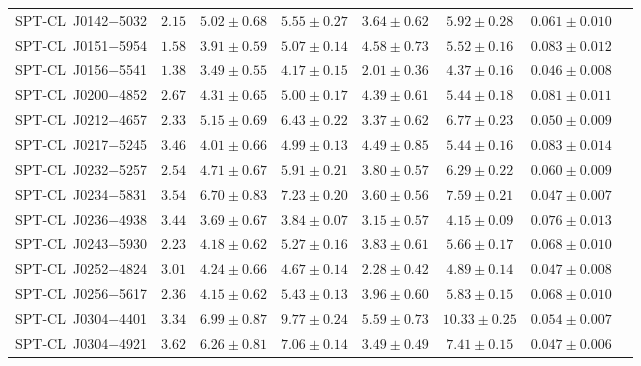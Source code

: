 \begin{table}
{\begin{tabular}{lccccccc}
    SPT-CL~J0142$-$5032    &$ 2.15 $    &$ 5.02 \pm 0.68 $    &$ 5.55 \pm 0.27 $    &$ 3.64 \pm 0.62 $     &$ 5.92 \pm 0.28 $    &$ 0.061 \pm 0.010 $    \\ 
    SPT-CL~J0151$-$5954    &$ 1.58 $    &$ 3.91 \pm 0.59 $    &$ 5.07 \pm 0.14 $    &$ 4.58 \pm 0.73 $     &$ 5.52 \pm 0.16 $    &$ 0.083 \pm 0.012 $    \\ 
    SPT-CL~J0156$-$5541    &$ 1.38 $    &$ 3.49 \pm 0.55 $    &$ 4.17 \pm 0.15 $    &$ 2.01 \pm 0.36 $     &$ 4.37 \pm 0.16 $    &$ 0.046 \pm 0.008 $    \\ 
    SPT-CL~J0200$-$4852    &$ 2.67 $    &$ 4.31 \pm 0.65 $    &$ 5.00 \pm 0.17 $    &$ 4.39 \pm 0.61 $     &$ 5.44 \pm 0.18 $    &$ 0.081 \pm 0.011 $    \\ 
    SPT-CL~J0212$-$4657    &$ 2.33 $    &$ 5.15 \pm 0.69 $    &$ 6.43 \pm 0.22 $    &$ 3.37 \pm 0.62 $     &$ 6.77 \pm 0.23 $    &$ 0.050 \pm 0.009 $    \\ 
    SPT-CL~J0217$-$5245    &$ 3.46 $    &$ 4.01 \pm 0.66 $    &$ 4.99 \pm 0.13 $    &$ 4.49 \pm 0.85 $     &$ 5.44 \pm 0.16 $    &$ 0.083 \pm 0.014 $    \\ 
    SPT-CL~J0232$-$5257    &$ 2.54 $    &$ 4.71 \pm 0.67 $    &$ 5.91 \pm 0.21 $    &$ 3.80 \pm 0.57 $     &$ 6.29 \pm 0.22 $    &$ 0.060 \pm 0.009 $    \\ 
    SPT-CL~J0234$-$5831    &$ 3.54 $    &$ 6.70 \pm 0.83 $    &$ 7.23 \pm 0.20 $    &$ 3.60 \pm 0.56 $     &$ 7.59 \pm 0.21 $    &$ 0.047 \pm 0.007 $    \\ 
    SPT-CL~J0236$-$4938    &$ 3.44 $    &$ 3.69 \pm 0.67 $    &$ 3.84 \pm 0.07 $    &$ 3.15 \pm 0.57 $     &$ 4.15 \pm 0.09 $    &$ 0.076 \pm 0.013 $    \\ 
    SPT-CL~J0243$-$5930    &$ 2.23 $    &$ 4.18 \pm 0.62 $    &$ 5.27 \pm 0.16 $    &$ 3.83 \pm 0.61 $     &$ 5.66 \pm 0.17 $    &$ 0.068 \pm 0.010 $    \\ 
    SPT-CL~J0252$-$4824    &$ 3.01 $    &$ 4.24 \pm 0.66 $    &$ 4.67 \pm 0.14 $    &$ 2.28 \pm 0.42 $     &$ 4.89 \pm 0.14 $    &$ 0.047 \pm 0.008 $    \\ 
    SPT-CL~J0256$-$5617    &$ 2.36 $    &$ 4.15 \pm 0.62 $    &$ 5.43 \pm 0.13 $    &$ 3.96 \pm 0.60 $     &$ 5.83 \pm 0.15 $    &$ 0.068 \pm 0.010 $    \\ 
    SPT-CL~J0304$-$4401    &$ 3.34 $    &$ 6.99 \pm 0.87 $    &$ 9.77 \pm 0.24 $    &$ 5.59 \pm 0.73 $     &$ 10.33 \pm 0.25 $    &$ 0.054 \pm 0.007 $    \\ 
    SPT-CL~J0304$-$4921    &$ 3.62 $    &$ 6.26 \pm 0.81 $    &$ 7.06 \pm 0.14 $    &$ 3.49 \pm 0.49 $     &$ 7.41 \pm 0.15 $    &$ 0.047 \pm 0.006 $    \\ 

\end{tabular}}
\end{table}
